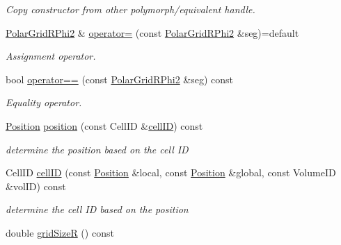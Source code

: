 \begin{DoxyCompactItemize}
\begin{DoxyCompactList}\small\item\em Copy constructor from other polymorph/equivalent handle. \end{DoxyCompactList}\item 
\hyperlink{class_d_d4hep_1_1_geometry_1_1_polar_grid_r_phi2}{Polar\+Grid\+R\+Phi2} \& \hyperlink{class_d_d4hep_1_1_geometry_1_1_polar_grid_r_phi2_aba3d404c57a059c35d5df97510163125}{operator=} (const \hyperlink{class_d_d4hep_1_1_geometry_1_1_polar_grid_r_phi2}{Polar\+Grid\+R\+Phi2} \&seg)=default
\begin{DoxyCompactList}\small\item\em Assignment operator. \end{DoxyCompactList}\item 
bool \hyperlink{class_d_d4hep_1_1_geometry_1_1_polar_grid_r_phi2_a12ade22a092c98a357fa54c747172e49}{operator==} (const \hyperlink{class_d_d4hep_1_1_geometry_1_1_polar_grid_r_phi2}{Polar\+Grid\+R\+Phi2} \&seg) const
\begin{DoxyCompactList}\small\item\em Equality operator. \end{DoxyCompactList}\item 
\hyperlink{namespace_d_d4hep_1_1_geometry_a55083902099d03506c6db01b80404900}{Position} \hyperlink{class_d_d4hep_1_1_geometry_1_1_polar_grid_r_phi2_ab1f19332f9e2b52b4854a7d37d1d901c}{position} (const Cell\+ID \&\hyperlink{class_d_d4hep_1_1_geometry_1_1_polar_grid_r_phi2_ad259f199ef0f54e752c28b436a7ee510}{cell\+ID}) const
\begin{DoxyCompactList}\small\item\em determine the position based on the cell ID \end{DoxyCompactList}\item 
Cell\+ID \hyperlink{class_d_d4hep_1_1_geometry_1_1_polar_grid_r_phi2_ad259f199ef0f54e752c28b436a7ee510}{cell\+ID} (const \hyperlink{namespace_d_d4hep_1_1_geometry_a55083902099d03506c6db01b80404900}{Position} \&local, const \hyperlink{namespace_d_d4hep_1_1_geometry_a55083902099d03506c6db01b80404900}{Position} \&global, const Volume\+ID \&vol\+ID) const
\begin{DoxyCompactList}\small\item\em determine the cell ID based on the position \end{DoxyCompactList}\item 
double \hyperlink{class_d_d4hep_1_1_geometry_1_1_polar_grid_r_phi2_afed7faf48368bf70d8edba36fd29b519}{grid\+SizeR} () const

\end{DoxyCompactItemize}
